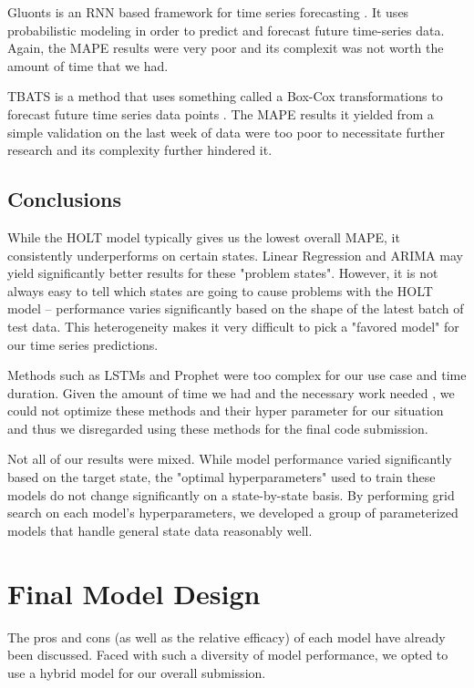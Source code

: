 \documentclass[sigconf,nonacm]{acmart}
\begin{document}
Gluonts is an RNN based framework for time series forecasting \cite{Gluonts}. It uses
probabilistic modeling in order to predict and forecast future time-series
data. Again, the MAPE results were very poor and its complexit was not worth
the amount of time that we had.

TBATS is a method that uses something called a Box-Cox transformations to 
forecast future time series data points \cite{TBATS}. The MAPE results it yielded from
a simple validation on the last week of data were too  poor to necessitate 
further research and its complexity further hindered it.


\subsection{Conclusions}

While the HOLT model typically gives us the lowest overall MAPE, it
consistently underperforms on certain states. Linear Regression and ARIMA may
yield significantly better results for these "problem states". However, it is
not always easy to tell which states are going to cause problems with the HOLT
model -- performance varies significantly based on the shape of the latest
batch of test data. This heterogeneity makes it very difficult to pick a
"favored model" for our time series predictions. 

Methods such as LSTMs and Prophet were too complex for our use case and
time duration. Given the amount of time we had and the necessary work needed 
, we could not optimize these methods and their hyper parameter for our
situation and thus we disregarded using these methods for the final code
submission.

Not all of our results were mixed. While model performance varied significantly
based on the target state, the "optimal hyperparameters" used to train these
models do not change significantly on a state-by-state basis. By performing
grid search on each model's hyperparameters, we developed a group of
parameterized models that handle general state data reasonably well. 



\section{Final Model Design}

The pros and cons (as well as the relative efficacy) of each model have already
been discussed. Faced with such a diversity of model performance, we opted to
use a hybrid model for our overall submission. 
\end{document}
